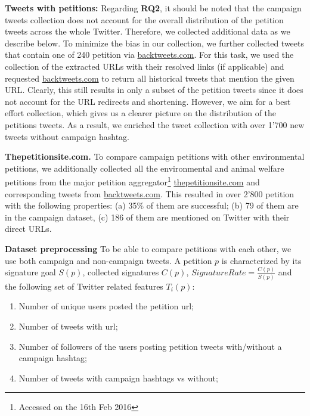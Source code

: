 \textbf{Tweets with petitions:}
Regarding \textbf{RQ2},
it should be noted that the campaign tweets collection does not account for the overall distribution of the petition tweets across the whole Twitter. 
Therefore, we collected additional data as we describe below.
To minimize the bias in our collection, we further collected tweets that contain one of 240 petition via \url{backtweets.com}. For this task, we used the collection of the extracted URLs with their resolved links (if applicable) and requested \url{backtweets.com} to return all historical tweets that mention the given URL.
Clearly, this still results in only a subset of the petition tweets since it does not account for the URL redirects and shortening. However, we aim for a best effort collection, which gives us a clearer picture on the distribution of the petitions tweets.
As a result, we enriched the tweet collection with over 1'700 new tweets without campaign hashtag.

\textbf{Thepetitionsite.com.} To compare campaign petitions with other environmental petitions, we additionally collected all the environmental and animal welfare petitions from the major petition aggregator\footnote{Accessed on the 16th Feb 2016} \url{thepetitionsite.com} and corresponding tweets from \url{backtweets.com}. This resulted in over 2'800 petition with the following properties: (a) 35\% of them are successful; (b) 79 of them are in the campaign dataset, (c) 186 of them are mentioned on Twitter with their direct URLs.

\textbf{Dataset preprocessing}
To be able to compare petitions with each other, we use both campaign and non-campaign tweets.
A petition $p$ is characterized by its signature goal $S(p)$, collected signatures $C(p)$, $SignatureRate = \frac{C(p)}{S(p)}$ and the following set of Twitter related features $T_i(p)$:
\begin{enumerate}
	\setlength\itemsep{0em}
	\item Number of unique users posted the petition url;
	\item Number of tweets with url;
	\item Number of followers of the users posting petition tweets with/without a campaign hashtag;
	\item Number of tweets with campaign hashtags vs without;
\end{enumerate}